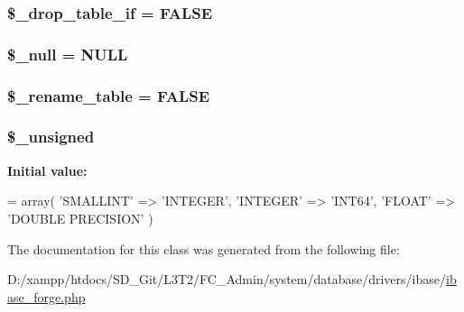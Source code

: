 \subsubsection[{\$\+\_\+drop\+\_\+table\+\_\+if}]{\setlength{\rightskip}{0pt plus 5cm}\$\+\_\+drop\+\_\+table\+\_\+if = F\+A\+L\+S\+E\hspace{0.3cm}{\ttfamily [protected]}}\label{class_c_i___d_b__ibase__forge_a92a8a9145a7fc91e252e58d019373581}
\hypertarget{class_c_i___d_b__ibase__forge_ae58fe6a5104d4a069a49b27533ce808f}{}
\subsubsection[{\$\+\_\+null}]{\setlength{\rightskip}{0pt plus 5cm}\$\+\_\+null = \textquotesingle{}N\+U\+L\+L\textquotesingle{}\hspace{0.3cm}{\ttfamily [protected]}}\label{class_c_i___d_b__ibase__forge_ae58fe6a5104d4a069a49b27533ce808f}
\hypertarget{class_c_i___d_b__ibase__forge_a1a649e7cf9de16bcf932977b18bc91de}{}
\subsubsection[{\$\+\_\+rename\+\_\+table}]{\setlength{\rightskip}{0pt plus 5cm}\$\+\_\+rename\+\_\+table = F\+A\+L\+S\+E\hspace{0.3cm}{\ttfamily [protected]}}\label{class_c_i___d_b__ibase__forge_a1a649e7cf9de16bcf932977b18bc91de}
\hypertarget{class_c_i___d_b__ibase__forge_aae977ae6d61fa183f0b25422b6ddc31c}{}
\subsubsection[{\$\+\_\+unsigned}]{\setlength{\rightskip}{0pt plus 5cm}\$\+\_\+unsigned\hspace{0.3cm}{\ttfamily [protected]}}\label{class_c_i___d_b__ibase__forge_aae977ae6d61fa183f0b25422b6ddc31c}
{\bfseries Initial value\+:}
\begin{DoxyCode}
= array(
        \textcolor{stringliteral}{'SMALLINT'}  => \textcolor{stringliteral}{'INTEGER'},
        \textcolor{stringliteral}{'INTEGER'}   => \textcolor{stringliteral}{'INT64'},
        \textcolor{stringliteral}{'FLOAT'}     => \textcolor{stringliteral}{'DOUBLE PRECISION'}
    )
\end{DoxyCode}


The documentation for this class was generated from the following file\+:\begin{DoxyCompactItemize}
\item 
D\+:/xampp/htdocs/\+S\+D\+\_\+\+Git/\+L3\+T2/\+F\+C\+\_\+\+Admin/system/database/drivers/ibase/\hyperlink{ibase__forge_8php}{ibase\+\_\+forge.\+php}\end{DoxyCompactItemize}
